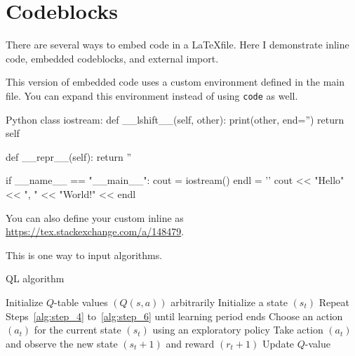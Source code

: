\section{Codeblocks}
There are several ways to embed code in a \LaTeX file.
Here I demonstrate inline code, embedded codeblocks, and external import.

This version of embedded code uses a custom environment defined in the main file.
You can expand this environment instead of using \texttt{code} as well.

\begin{code}{Python}
  class iostream:
      def __lshift__(self, other):
          print(other, end='')
          return self

      def __repr__(self):
          return ''


  if __name__ == "__main__":
      cout = iostream()
      endl = '\n'
      cout << "Hello" << ", " << "World!" << endl
\end{code}


You can also define your custom inline as \url{https://tex.stackexchange.com/a/148479}.

This is one way to input algorithms.

\begin{algorithm}
  \caption{QL algorithm}
  Initialize $Q$-table values $(Q(s, a))$ arbitrarily\;
  Initialize a state $(s_t)$\;
  Repeat Steps~\ref{alg:step_4} to~\ref{alg:step_6} until learning period ends\;
  Choose an action $(a_t)$ for the current state $(s_t)$ using an exploratory policy\; 
  Take action $(a_t)$ and observe the new state $(s_t + 1)$ and reward $(r_t + 1)$\;
  Update $Q$-value\; 
\end{algorithm}
